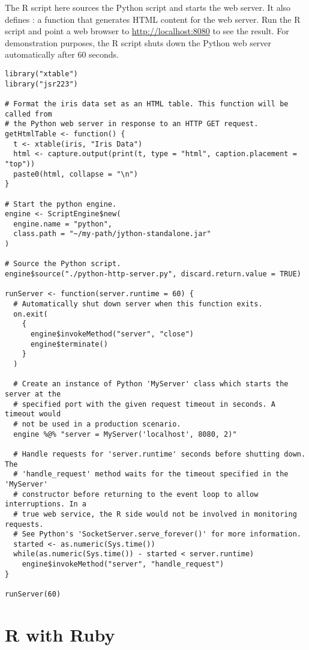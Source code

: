 The R script here sources the Python script and starts the web server. It also defines : a function that generates HTML content for the web server. Run the R script and point a web browser to \url{http://localhost:8080} to see the result. For demonstration purposes, the R script shuts down the Python web server automatically after 60 seconds.

\begin{verbatim}
library("xtable")
library("jsr223")

# Format the iris data set as an HTML table. This function will be called from
# the Python web server in response to an HTTP GET request.
getHtmlTable <- function() {
  t <- xtable(iris, "Iris Data")
  html <- capture.output(print(t, type = "html", caption.placement = "top"))
  paste0(html, collapse = "\n")
}

# Start the python engine.
engine <- ScriptEngine$new(
  engine.name = "python",
  class.path = "~/my-path/jython-standalone.jar"
)

# Source the Python script.
engine$source("./python-http-server.py", discard.return.value = TRUE)

runServer <- function(server.runtime = 60) {
  # Automatically shut down server when this function exits.
  on.exit(
    {
      engine$invokeMethod("server", "close")
      engine$terminate()
    }
  )

  # Create an instance of Python 'MyServer' class which starts the server at the
  # specified port with the given request timeout in seconds. A timeout would
  # not be used in a production scenario.
  engine %@% "server = MyServer('localhost', 8080, 2)"

  # Handle requests for 'server.runtime' seconds before shutting down. The 
  # 'handle_request' method waits for the timeout specified in the 'MyServer' 
  # constructor before returning to the event loop to allow interruptions. In a 
  # true web service, the R side would not be involved in monitoring requests.
  # See Python's 'SocketServer.serve_forever()' for more information.
  started <- as.numeric(Sys.time())
  while(as.numeric(Sys.time()) - started < server.runtime)
    engine$invokeMethod("server", "handle_request")
}

runServer(60)
\end{verbatim}

\section{R with Ruby}


